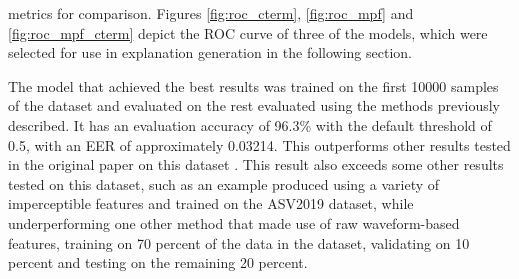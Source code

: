 \documentclass{article}
\begin{document}
		metrics for comparison. Figures \ref{fig:roc_cterm}, \ref{fig:roc_mpf} and
		\ref{fig:roc_mpf_cterm} depict the ROC curve of three of the models, which were selected
		for use in explanation generation in the following section.
		\par
		The model that achieved the best results was trained on the first
		10000 samples of the dataset and evaluated on the rest evaluated using the methods
		previously described. It has an evaluation accuracy of 96.3\% with the default threshold
		of 0.5, with an EER of approximately 0.03214. This outperforms other results tested in the
		original paper on this dataset \cite{muller_does_2022}. This result also exceeds some
		other results tested on this dataset, such as an example \cite{yang_robust_2024} produced
		using a variety of imperceptible features and trained on the ASV2019 dataset, while
		underperforming one other method \cite{ranjan_statnet_2022} that made use of raw
		waveform-based features, training on 70 percent of the data in the dataset, validating on
		10 percent and testing on the remaining 20 percent.
\end{document}
